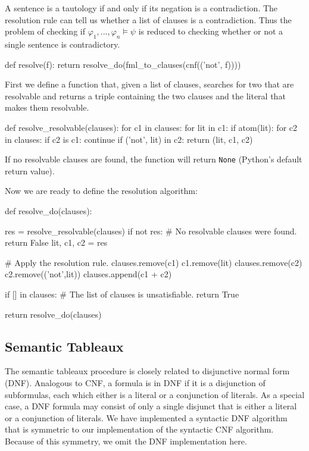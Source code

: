 \documentclass[a4paper,notitlepage]{scrartcl}
\let\phi\varphi
\begin{document}
A sentence is a tautology if and only if its negation is a contradiction.
The resolution rule can tell us whether a list of clauses is a contradiction.
Thus the problem of checking if $\phi_1,...,\phi_n\models\psi$ is reduced
   to checking whether or not a single sentence is contradictory.

\begin{code}
def resolve(f):
    return resolve_do(fml_to_clauses(cnf(('not', f))))
\end{code}

First we define a function that, given a list of clauses, searches for two
   that are resolvable and returns a triple containing the two clauses
   and the literal that makes them resolvable.

\begin{code}
def resolve_resolvable(clauses):
    for c1 in clauses:
        for lit in c1:
            if atom(lit):
                for c2 in clauses:
                    if c2 is c1:
                        continue
                    if ('not', lit) in c2:
                        return (lit, c1, c2)
\end{code}
If no resolvable clauses are found, the function will return \texttt{None}
   (Python's default return value).

Now we are ready to define the resolution algorithm:

\begin{code}
def resolve_do(clauses):

    res = resolve_resolvable(clauses)
    if not res:
        # No resolvable clauses were found.
        return False
    lit, c1, c2 = res

    # Apply the resolution rule.
    clauses.remove(c1)
    c1.remove(lit)
    clauses.remove(c2)
    c2.remove(('not',lit))
    clauses.append(c1 + c2)

    if [] in clauses:
        # The list of clauses is unsatisfiable.
        return True

    return resolve_do(clauses)
\end{code}

\subsection{Semantic Tableaux}

The semantic tableaux procedure is closely related to disjunctive normal form
(DNF). Analogous to CNF, a formula is in DNF if it is a disjunction of
subformulas, each which either is a literal or a conjunction of literals. As a
special case, a DNF formula may consist of only a single disjunct that is
either a literal or a conjunction of literals. We have implemented a syntactic
DNF algorithm that is symmetric to our implementation of the syntactic CNF
algorithm. Because of this symmetry, we omit the DNF implementation here.
\end{document}
